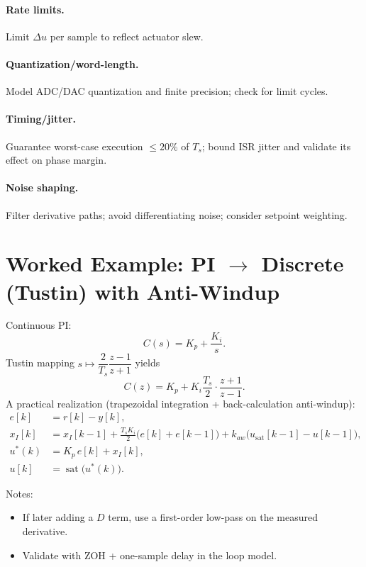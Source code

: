 \documentclass[11pt,a4paper]{article}
\begin{document}
	\paragraph{Rate limits.} Limit $\Delta u$ per sample to reflect actuator slew.
	
	\paragraph{Quantization/word-length.} Model ADC/DAC quantization and finite precision; check for limit cycles.
	
	\paragraph{Timing/jitter.} Guarantee worst-case execution $\le 20\%$ of $T_s$; bound ISR jitter and validate its effect on phase margin.
	
	\paragraph{Noise shaping.} Filter derivative paths; avoid differentiating noise; consider setpoint weighting.
	
	\section{Worked Example: PI $\to$ Discrete (Tustin) with Anti-Windup}
	Continuous PI:
	$$
	C(s) = K_p + \frac{K_i}{s}.
	$$
	Tustin mapping $s \mapsto \dfrac{2}{T_s}\dfrac{z-1}{z+1}$ yields
	$$
	C(z) = K_p + K_i \frac{T_s}{2}\cdot \frac{z+1}{z-1}.
	$$
	A practical realization (trapezoidal integration + back-calculation anti-windup):
	\[
	\begin{aligned}
		e[k]   &= r[k] - y[k],\\
		x_I[k] &= x_I[k-1] + \frac{T_s K_i}{2}\big(e[k] + e[k-1]\big)
		+ k_{aw}\big(u_{\text{sat}}[k-1] - u[k-1]\big),\\
		u^{\ast}(k) &= K_p\,e[k] + x_I[k],\\
		u[k] &= \operatorname{sat}\big(u^{\ast}(k)\big).
	\end{aligned}
	\]
	
	Notes:
	\begin{itemize}
		\item If later adding a $D$ term, use a first-order low-pass on the measured derivative.
		\item Validate with ZOH + one-sample delay in the loop model.
	\end{itemize}
	
\end{document}

